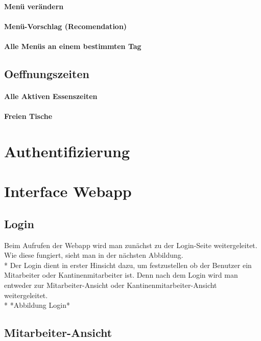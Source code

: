 \paragraph{Menü verändern}

\paragraph{Menü-Vorschlag (Recomendation)}

\paragraph{Alle Menüs an einem bestimmten Tag}


\subsection{Oeffnungszeiten}

\paragraph{Alle Aktiven Essenszeiten}

\paragraph{Freien Tische}


\section{Authentifizierung}

\section {Interface Webapp}
\author{Benjamin Besic}
\subsection{Login}
Beim Aufrufen der Webapp wird man zunächst zu der Login-Seite weitergeleitet. Wie diese fungiert, sieht man in der nächsten Abbildung. \\*
Der Login dient in erster Hinsicht dazu, um festzustellen ob der Benutzer ein Mitarbeiter oder Kantinenmitarbeiter ist.
Denn nach dem Login wird man entweder zur Mitarbeiter-Ansicht oder Kantinenmitarbeiter-Ansicht weitergeleitet. \\*
*Abbildung Login*

\subsection {Mitarbeiter-Ansicht}

